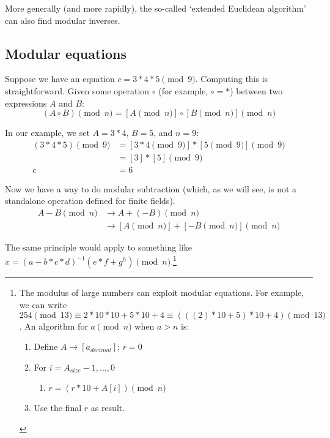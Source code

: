More generally (and more rapidly), the so-called `extended Euclidean algorithm' \cite{extended-euclidean-algorithm} can also find modular inverses.


\subsection{Modular equations}
\label{subsec:modular-equations}

Suppose we have an equation $c = 3*4*5 \pmod 9$. Computing this is straightforward. Given some operation $\circ$ (for example, $\circ = *$) between two expressions $A$ and $B$:\vspace{.175cm}
\[(A \circ B)\pmod{n} = {[A\pmod {n}] \circ [B\pmod{n}]}\pmod{n}\]

In our example, we set $A = 3*4$, $B = 5$, and $n = 9$:\vspace{.175cm}
\begin{align*}
(3*4 * 5) \pmod{9} &= {[3*4 \pmod {9}] * [5 \pmod{9}]} \pmod{9} \\
				   &= [3]*[5] \pmod 9 \\
				 c &= 6
\end{align*}

Now we have a way to do modular subtraction (which, as we will see, is not a standalone operation defined for finite fields).\vspace{.175cm}
\begin{align*}
A - B \pmod n &\rightarrow A + (-B) \pmod n \\
			  &\rightarrow {[A \pmod {n}] + [-B \pmod{n}]} \pmod{n}
\end{align*}

The same principle would apply to something like $x = (a-b*c*d)^{-1} (e*f+g^{h}) \pmod n$.\footnote{The modulus of large numbers can exploit modular equations. For example, we can write $254 \pmod {13} \equiv 2*10*10 + 5*10 + 4 \equiv (((2)*10 + 5)*10 + 4) \pmod {13}$. An algorithm for $a \pmod n$ when $a > n$ is:
\begin{enumerate}
	\item Define $A \rightarrow [a_{decimal}]$; $r = 0$
	\item For $i = A_{size} - 1,...,0$
	\begin{enumerate}
		\item $r = (r*10 + A[i]) \pmod n$
	\end{enumerate}
	\item Use the final $r$ as result.
\end{enumerate}}



